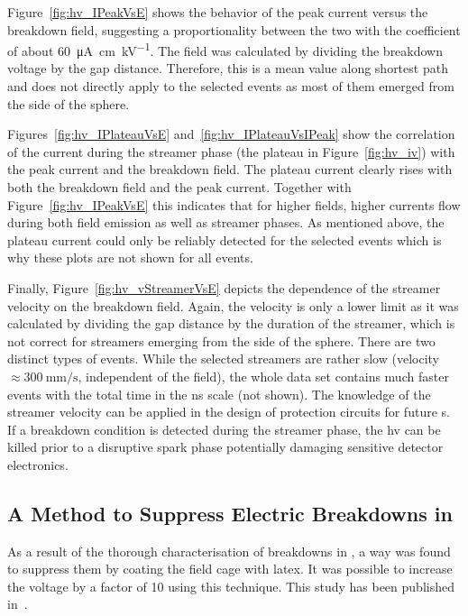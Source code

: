 Figure~\ref{fig:hv_IPeakVsE} shows the behavior of the peak current versus the breakdown field, suggesting a proportionality between the two with the coefficient of about \SI{60}{\micro\ampere\centi\metre\per\kilo\volt}.
The field was calculated by dividing the breakdown voltage by the gap distance.
Therefore, this is a mean value along shortest path and does not directly apply to the selected events as most of them emerged from the side of the sphere.

Figures~\ref{fig:hv_IPlateauVsE} and~\ref{fig:hv_IPlateauVsIPeak} show the correlation of the current during the streamer phase (the plateau in Figure~\ref{fig:hv_iv}) with the peak current and the breakdown field.
The plateau current clearly rises with both the breakdown field and the peak current.
Together with Figure~\ref{fig:hv_IPeakVsE} this indicates that for higher fields, higher currents flow during both field emission as well as streamer phases.
As mentioned above, the plateau current could only be reliably detected for the selected events which is why these plots are not shown for all events.

Finally, Figure~\ref{fig:hv_vStreamerVsE} depicts the dependence of the streamer velocity on the breakdown field.
Again, the velocity is only a lower limit as it was calculated by dividing the gap distance by the duration of the streamer, which is not correct for streamers emerging from the side of the sphere.
There are two distinct types of events.
While the selected streamers are rather slow (velocity $\approx \SI{300}{\milli\metre\per\second}$, independent of the field), the whole data set contains much faster events with the total time in the ns scale (not shown).
The knowledge of the streamer velocity can be applied in the design of protection circuits for future \lartpc{}s.
If a breakdown condition is detected during the streamer phase, the \gls{hv} can be killed prior to a disruptive spark phase potentially damaging sensitive detector electronics.


\subsection{A Method to Suppress Electric Breakdowns in }
\label{sec:studies_hv_latex}

As a result of the thorough characterisation of breakdowns in \lar{}, a way was found to suppress them by coating the field cage with latex.
It was possible to increase the voltage by a factor of \num{10} using this technique.
This study has been published in~\cite{latex}.

